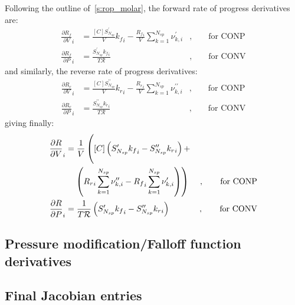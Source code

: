 \documentclass[12pt]{article}
\newcommand{\ns}{\ensuremath{{N_{sp}}}}
\newcommand{\conp}{CONP}
\newcommand{\conv}{CONV}
\newcommand{\dconp}{\ensuremath{,\qquad\text{for \conp}}}
\newcommand{\dconv}{\ensuremath{,\qquad\text{for \conv}}}
\newcommand{\Ru}{\ensuremath{\mathcal{R}}}
\begin{document}
Following the outline of~\cref{s:rop_molar}, the forward rate of progress derivatives are:
\begin{subequations}
 \begin{align}
  \frac{\partial {R_f} }{\partial V }_{i} &= \frac{[C] S^{\prime}_{\ns}}{V} {k_f}_{i} - \frac{{R_f}_{i}}{V} \sum_{k=1}^{\ns} \nu^{\prime}_{k,i}&\dconp\\
  \frac{\partial {R_f} }{\partial P }_{i} &= \frac{S^{\prime}_{\ns} {k_f}_{i}}{T \Ru}&\dconv
 \end{align}
\end{subequations}
and similarly, the reverse rate of progress derivatives:
\begin{subequations}
 \begin{align}
  \frac{\partial {R_r} }{\partial V }_{i} &= \frac{[C] S^{\prime\prime}_{\ns}}{V} {k_r}_{i} - \frac{{R_r}_{i}}{V} \sum_{k=1}^{\ns} \nu^{\prime\prime}_{k,i}&\dconp\\
  \frac{\partial {R_r} }{\partial P }_{i} &= \frac{S^{\prime\prime}_{\ns} {k_r}_{i}}{T \Ru}&\dconv
 \end{align}
\end{subequations}
giving finally:
\begin{subequations}
 \label{e:dropi_de}
 \begin{align}
  \frac{\partial {R} }{\partial V }_{i} &= \frac{1}{V}\left(\vphantom{{R_r}_{i} \sum_{k=1}^{\ns} \nu^{\prime\prime}_{k,i}} [C]\left(S^{\prime}_{\ns} {k_f}_{i} - S^{\prime\prime}_{\ns} {k_r}_{i}\right) + \right.& \nonumber\\
  &\left. \quad\left({R_r}_{i} \sum_{k=1}^{\ns} \nu^{\prime\prime}_{k,i} - {R_f}_{i} \sum_{k=1}^{\ns} \nu^{\prime}_{k,i}\right) \right)&\dconp\\
  \frac{\partial {R} }{\partial P }_{i} &= \frac{1}{T \Ru} \left(S^{\prime}_{\ns} {k_f}_{i} - S^{\prime\prime}_{\ns} {k_r}_{i}\right)&\dconv
 \end{align}
\end{subequations}

\subsection{Pressure modification\slash Falloff function derivatives}




\subsection{Final Jacobian entries}
\label{s:jac_final}

\printbibliography 
\end{document}

